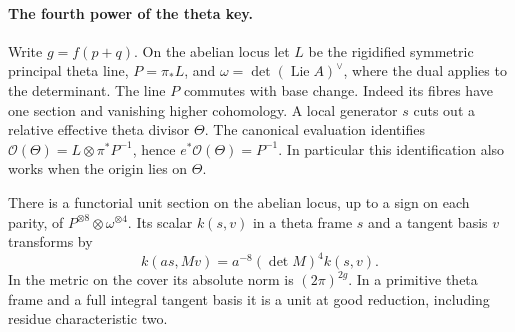 \paragraph{The fourth power of the theta key.}
Write \(g=f(p+q)\). On the abelian locus let \(L\) be the rigidified
symmetric principal theta line, \(P=\pi_*L\), and
\(\omega=\det(\operatorname{Lie} A)^\vee\), where the dual applies to
the determinant. The line \(P\) commutes with base change. Indeed its
fibres have one section and vanishing higher cohomology. A local
generator \(s\) cuts out a relative effective theta divisor
\(\Theta\). The canonical evaluation identifies
\(\mathcal O(\Theta)=L\otimes\pi^*P^{-1}\), hence
\(e^*\mathcal O(\Theta)=P^{-1}\). In particular this identification
also works when the origin lies on \(\Theta\).

\begin{proposition}\label{ctwist:key}
There is a functorial unit section on the abelian locus, up to a
sign on each parity, of \(P^{\otimes8}\otimes\omega^{\otimes4}\).
Its scalar \(k(s,v)\) in a theta frame \(s\) and a tangent basis
\(v\) transforms by
\[
 k(a s,Mv)=a^{-8}(\det M)^4 k(s,v).
\]
In the metric on the cover its absolute norm is \((2\pi)^{2g}\).
In a primitive theta frame and a full integral tangent basis it is
a unit at good reduction, including residue characteristic two.
\end{proposition}
